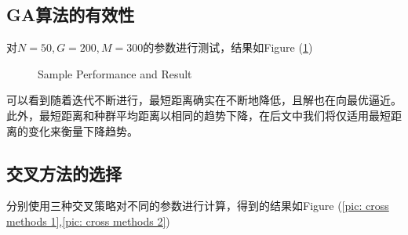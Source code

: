 \documentclass[12pt]{article}
\begin{document}
\subsection{GA算法的有效性}
对$N=50,G=200,M=300$的参数进行测试，结果如Figure (\ref{pic: Sample})
\begin{figure}[H]
  \centering
  \caption{Sample Performance and Result}
  \label{pic: Sample}
\end{figure}

可以看到随着迭代不断进行，最短距离确实在不断地降低，且解也在向最优逼近。
此外，最短距离和种群平均距离以相同的趋势下降，在后文中我们将仅适用最短距离的变化来衡量下降趋势。

\subsection{交叉方法的选择}
分别使用三种交叉策略对不同的参数进行计算，得到的结果如Figure (\ref{pic: cross methods 1},\ref{pic: cross methods 2})
\end{document}
